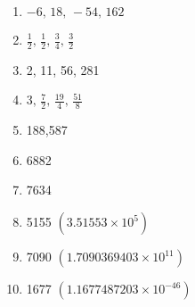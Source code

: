\begin{enumerate}
	\item $-6, \, 18, \, -54, \, 162$
    \item $\frac{1}{2}, \, \frac{1}{2}, \, \frac{3}{4}, \, \frac{3}{2}$
    \item 2, 11, 56, 281
    \item $3, \, \frac{7}{2}, \, \frac{19}{4}, \, \frac{51}{8}$
    \item 188,587
    \item 6882
    \item 7634
    \item 5155 $(3.51553 \times 10^5)$
	\item 7090 $(1.7090369403 \times 10^{11})$
	\item 1677 $(1.1677487203 \times 10^{-46})$
\end{enumerate}